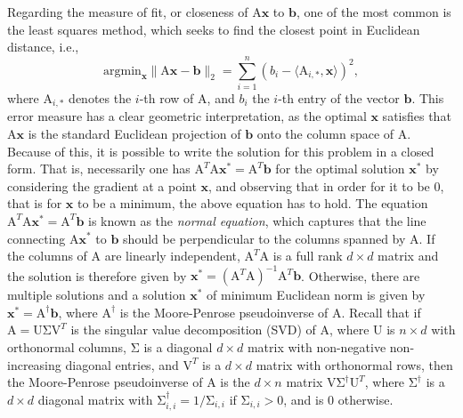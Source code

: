 \documentclass[11pt]{article}
\newcommand{\mat}[1]{{\ensuremath{\bm{\mathrm{#1}}}}}
\def\b{{\mathbf b}}
\def\matA{\mat{A}}
\def\matU{\mat{U}}
\def\matV{\mat{V}}
\def\x{{\mathbf x}}
\def\b{{\mathbf b}}
\begin{document}
Regarding the measure of fit, or closeness of $\matA \x$ to $\b$, one of the most
common is the least squares method, which seeks to find the closest point
in Euclidean distance, i.e., 
$$\textrm{argmin}_{\x} \|\matA \x-\b\|_2 = \sum_{i=1}^n (b_i - \langle \matA_{i,*}, \x \rangle )^2,$$
 where $\matA_{i,*}$ denotes the $i$-th row of $\matA$, and $b_i$ the $i$-th
entry of the vector $\b$. This error measure
has a clear geometric interpretation, 
as the optimal $\x$ satisfies that $\matA \x$ is the standard Euclidean
projection of $\b$ onto the column space of $\matA$. Because of this, it is possible
to write the solution for this problem in a closed form. 
That is,
necessarily one has $\matA^T \matA \x^* = \matA^T \b$ for the optimal solution $\x^*$ by 
considering the gradient at a point $\x$, and observing that in order for it
to be $0$, that is for $\x$ to be a minimum, the above equation has to hold. The
equation $\matA^T \matA \x^* = \matA^T \b$ is known as the {\it normal equation}, which
captures that the line connecting $\matA \x^*$ to $\b$ should be perpendicular to the
columns spanned by $\matA$. If
the columns of $\matA$ are linearly independent, $\matA^T \matA$ is a full rank $d \times d$
matrix and the solution is therefore given by $\x^* = (\matA^T \matA)^{-1} \matA^T \b$. Otherwise,
there are multiple solutions and a solution $\x^*$ of minimum Euclidean norm
is given by $\x^* = \matA^{\dagger} \b$, where $\matA^{\dagger}$ is the Moore-Penrose pseudoinverse
of $\matA$. Recall that if $\matA = \matU \mat\Sigma \matV^T$ is the singular value decomposition (SVD)
of $\matA$, where $\matU$ is $n \times d$ with orthonormal columns, $\mat\Sigma$ is a diagonal
$d \times d$ matrix with non-negative non-increasing diagonal entries, and $\matV^T$
is a $d \times d$ matrix with orthonormal rows, then the Moore-Penrose pseudoinverse of $\matA$
is the $d \times n$ matrix $\matV \mat\Sigma^{\dagger} \matU^T$, where $\mat\Sigma^{\dagger}$ is a $d \times
d$ diagonal matrix with $\mat\Sigma^{\dagger}_{i,i} = 1/\mat\Sigma_{i,i}$ if $\mat\Sigma_{i,i} > 0$,
and is $0$ otherwise. 
\end{document}
